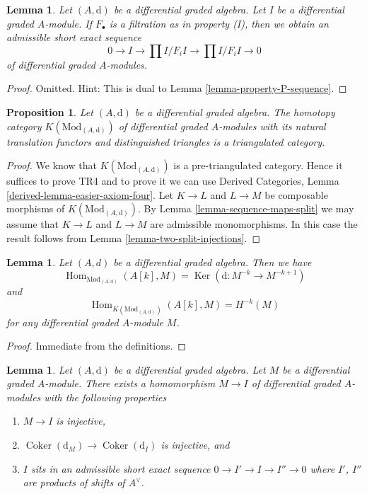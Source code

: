 \documentclass{stacks-project}
\theoremstyle{plain}
\newtheorem{proposition}[subsection]{Proposition}
\newtheorem{lemma}[subsection]{Lemma}
\theoremstyle{definition}
\theoremstyle{remark}
\numberwithin{equation}{subsection}
\def\Hom{\mathop{\mathrm{Hom}}\nolimits}
\def\Ker{\mathop{\mathrm{Ker}}}
\def\Coker{\mathop{\mathrm{Coker}}}
\begin{document}
\begin{lemma}
\label{lemma-property-I-sequence}
Let $(A, \text{d})$ be a differential graded algebra.
Let $I$ be a differential graded $A$-module. If $F_\bullet$
is a filtration as in property (I), then we obtain an
admissible short exact sequence
$$
0 \to I \to
\prod\nolimits I/F_iI \to
\prod\nolimits I/F_iI \to 0
$$
of differential graded $A$-modules.
\end{lemma}

\begin{proof}
Omitted. Hint: This is dual to Lemma \ref{lemma-property-P-sequence}.
\end{proof}

\begin{proposition}
\label{proposition-homotopy-category-triangulated}
Let $(A, \text{d})$ be a differential graded algebra. The homotopy category
$K(\text{Mod}_{(A, \text{d})})$ of differential graded $A$-modules with its
natural translation functors and distinguished triangles is a triangulated
category.
\end{proposition}

\begin{proof}
We know that $K(\text{Mod}_{(A, \text{d})})$ is a pre-triangulated category.
Hence it suffices to prove TR4 and to prove it we can use
Derived Categories, Lemma \ref{derived-lemma-easier-axiom-four}.
Let $K \to L$ and $L \to M$ be composable morphisms of
$K(\text{Mod}_{(A, \text{d})})$. By
Lemma \ref{lemma-sequence-maps-split} we may assume that
$K \to L$ and $L \to M$ are admissible monomorphisms.
In this case the result follows from
Lemma \ref{lemma-two-split-injections}.
\end{proof}

\begin{lemma}
\label{lemma-hom-from-shift-free}
Let $(A, d)$ be a differential graded algebra. Then we have
$$
\Hom_{\text{Mod}_{(A, \text{d})}}(A[k], M) =
\Ker(\text{d} : M^{-k} \to M^{-k + 1})
$$
and
$$
\Hom_{K(\text{Mod}_{(A, \text{d})})}(A[k], M) = H^{-k}(M)
$$
for any differential graded $A$-module $M$.
\end{lemma}

\begin{proof}
Immediate from the definitions.
\end{proof}

\begin{lemma}
\label{lemma-good-sub}
Let $(A, \text{d})$ be a differential graded algebra.
Let $M$ be a differential graded $A$-module. There exists a homomorphism
$M \to I$ of differential graded $A$-modules with the following
properties
\begin{enumerate}
\item $M \to I$ is injective,
\item $\Coker(\text{d}_M) \to \Coker(\text{d}_I)$ is injective,
and
\item $I$ sits in an admissible short exact sequence
$0 \to I' \to I \to I'' \to 0$ where $I'$, $I''$ are products
of shifts of $A^\vee$.
\end{enumerate}
\end{lemma}
\end{document}
